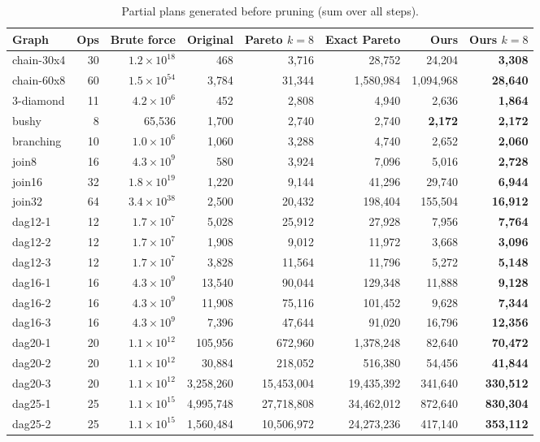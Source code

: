 \documentclass[10pt,a4paper]{article}
\begin{document}
\begin{longtable}{@{}lrr|rrrrr@{}}
\caption{Partial plans generated before pruning (sum over all steps).}\label{tab:generated}\\
\toprule
Graph & Ops & Brute force & Original & Pareto $k{=}8$ & Exact Pareto & \textbf{Ours} & Ours $k{=}8$\\
\midrule\endhead
chain-30x4 & 30 & $1.2\times10^{18}$ & 468 & 3{,}716 & 28{,}752 & 24{,}204 & \textbf{3{,}308}\\
chain-60x8 & 60 & $1.5\times10^{54}$ & 3{,}784 & 31{,}344 & 1{,}580{,}984 & 1{,}094{,}968 & \textbf{28{,}640}\\
3-diamond & 11 & $4.2\times10^{6}$ & 452 & 2{,}808 & 4{,}940 & 2{,}636 & \textbf{1{,}864}\\
bushy & 8 & 65{,}536 & 1{,}700 & 2{,}740 & 2{,}740 & \textbf{2{,}172} & \textbf{2{,}172}\\
branching & 10 & $1.0\times10^{6}$ & 1{,}060 & 3{,}288 & 4{,}740 & 2{,}652 & \textbf{2{,}060}\\
join8 & 16 & $4.3\times10^{9}$ & 580 & 3{,}924 & 7{,}096 & 5{,}016 & \textbf{2{,}728}\\
join16 & 32 & $1.8\times10^{19}$ & 1{,}220 & 9{,}144 & 41{,}296 & 29{,}740 & \textbf{6{,}944}\\
join32 & 64 & $3.4\times10^{38}$ & 2{,}500 & 20{,}432 & 198{,}404 & 155{,}504 & \textbf{16{,}912}\\
dag12-1 & 12 & $1.7\times10^{7}$ & 5{,}028 & 25{,}912 & 27{,}928 & 7{,}956 & \textbf{7{,}764}\\
dag12-2 & 12 & $1.7\times10^{7}$ & 1{,}908 & 9{,}012 & 11{,}972 & 3{,}668 & \textbf{3{,}096}\\
dag12-3 & 12 & $1.7\times10^{7}$ & 3{,}828 & 11{,}564 & 11{,}796 & 5{,}272 & \textbf{5{,}148}\\
dag16-1 & 16 & $4.3\times10^{9}$ & 13{,}540 & 90{,}044 & 129{,}348 & 11{,}888 & \textbf{9{,}128}\\
dag16-2 & 16 & $4.3\times10^{9}$ & 11{,}908 & 75{,}116 & 101{,}452 & 9{,}628 & \textbf{7{,}344}\\
dag16-3 & 16 & $4.3\times10^{9}$ & 7{,}396 & 47{,}644 & 91{,}020 & 16{,}796 & \textbf{12{,}356}\\
dag20-1 & 20 & $1.1\times10^{12}$ & 105{,}956 & 672{,}960 & 1{,}378{,}248 & 82{,}640 & \textbf{70{,}472}\\
dag20-2 & 20 & $1.1\times10^{12}$ & 30{,}884 & 218{,}052 & 516{,}380 & 54{,}456 & \textbf{41{,}844}\\
dag20-3 & 20 & $1.1\times10^{12}$ & 3{,}258{,}260 & 15{,}453{,}004 & 19{,}435{,}392 & 341{,}640 & \textbf{330{,}512}\\
dag25-1 & 25 & $1.1\times10^{15}$ & 4{,}995{,}748 & 27{,}718{,}808 & 34{,}462{,}012 & 872{,}640 & \textbf{830{,}304}\\
dag25-2 & 25 & $1.1\times10^{15}$ & 1{,}560{,}484 & 10{,}506{,}972 & 24{,}273{,}236 & 417{,}140 & \textbf{353{,}112}\\
\bottomrule
\end{longtable}
\end{document}
